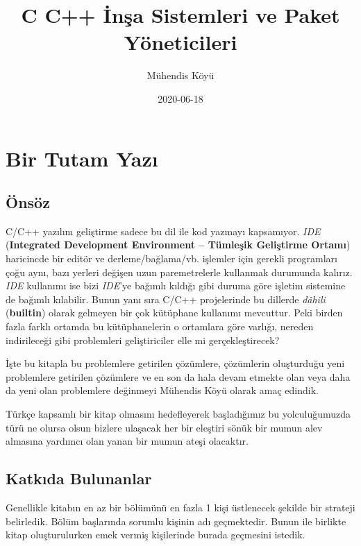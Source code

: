 \documentclass[
]{book}
\title{C C++ İnşa Sistemleri ve Paket Yöneticileri}
\author{Mühendis Köyü}
\date{2020-06-18}
\begin{document}
\maketitle

{
\setcounter{tocdepth}{1}
\tableofcontents
}
\hypertarget{bir-tutam-yazux131}{%
\chapter*{Bir Tutam Yazı}\label{bir-tutam-yazux131}}

\hypertarget{uxf6nsuxf6z}{%
\section*{Önsöz}\label{uxf6nsuxf6z}}

C/C++ yazılım geliştirme sadece bu dil ile kod yazmayı kapsamıyor. \emph{IDE} (\textbf{Integrated Development Environment -- Tümleşik Geliştirme Ortamı}) haricincde bir editör ve derleme/bağlama/vb. işlemler için gerekli programları çoğu aynı, bazı yerleri değişen uzun paremetrelerle kullanmak durumunda kalırız. \emph{IDE} kullanımı ise bizi \emph{IDE}'ye bağımlı kıldığı gibi duruma göre işletim sistemine de bağımlı kılabilir. Bunun yanı sıra C/C++ projelerinde bu dillerde \emph{dâhili} (\textbf{builtin}) olarak gelmeyen bir çok kütüphane kullanımı mevcuttur. Peki birden fazla farklı ortamda bu kütüphanelerin o ortamlara göre varlığı, nereden indirileceği gibi problemleri geliştiriciler elle mi gerçekleştirecek?

İşte bu kitapla bu problemlere getirilen çözümlere, çözümlerin oluşturduğu yeni problemlere getirilen çözümlere ve en son da hala devam etmekte olan veya daha da yeni olan problemlere değinmeyi Mühendis Köyü olarak amaç edindik.

Türkçe kapsamlı bir kitap olmasını hedefleyerek başladığımız bu yolculuğumuzda türü ne olursa olsun bizlere ulaşacak her bir eleştiri sönük bir mumun alev almasına yardımcı olan yanan bir mumun ateşi olacaktır.

\hypertarget{katkux131da-bulunanlar}{%
\section*{Katkıda Bulunanlar}\label{katkux131da-bulunanlar}}

Genellikle kitabın en az bir bölümünü en fazla 1 kişi üstlenecek şekilde bir strateji belirledik. Bölüm başlarında sorumlu kişinin adı geçmektedir. Bunun ile birlikte kitap oluşturulurken emek vermiş kişilerinde burada geçmesini istedik.
\end{document}

